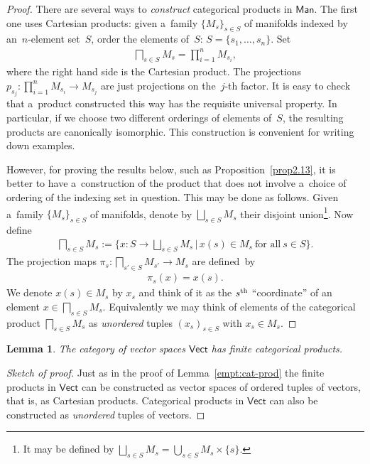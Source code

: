 \documentclass[10pt,a4paper]{amsart}
\numberwithin{equation}{section}
\newtheorem{Lemma}[Theorem]{Lemma}
\begin{document}
\begin{proof}
There are several ways to {\em construct} categorical products in $\mathsf{Man}$.
The f\/irst one uses Cartesian products: given a~family $\{M_s\}_{s\in S}$ of manifolds indexed by an~$n$-element set~$S$,
order the elements of~$S$: $S=\{s_1, \ldots, s_n\}$.
Set
\begin{gather*}
\bigsqcap_{s\in S}M_{s} = \prod\limits_{i=1}^n M_{s_i},
\end{gather*}
where the right hand side is the Cartesian product.
The projections $p_{s_j}: \prod\limits_{i=1}^n M_{s_i} \to M_{s_j} $ are just projections on the~$j$-th factor.
It is easy to check that a~product constructed this way has the requisite universal property.
In particular, if we choose two dif\/ferent orderings of elements of~$S$, the resulting products are canonically
isomorphic.
This construction is convenient for writing down examples.

However, for proving the results below, such as Proposition~\ref{prop2.13}, it is better to have a~construction of the
product that does not involve a~choice of ordering of the indexing set in question.
This may be done as follows.
Given a~family $\{M_s\}_{s\in S} $ of manifolds, denote by $\bigsqcup_{s\in S}M_s$ their disjoint union\footnote{It may
be def\/ined by $\bigsqcup\limits_{s\in S}M_s = \bigcup\limits_{s\in S} M_s\times \{s\}$.}.
Now def\/ine
\begin{gather*}
\bigsqcap_{s\in S}M_{s}:= \bigg\{x\colon S \to \bigsqcup_{s\in S}M_s \, \bigg| \,  x(s)\in M_s\ \text{for all}\ s\in S\bigg\}.
\end{gather*}
The projection maps $\pi_s\colon \bigsqcap\limits_{s'\in S}M_{s'}\to M_s$ are def\/ined~by
\begin{gather*}
\pi_s (x) = x(s).
\end{gather*}
We denote $x(s)\in M_s$ by $x_s$ and think of it as the $s^{\rm th}$ ``coordinate''
of an element $x\in \bigsqcap\limits_{s\in S}M_{s}$.
Equivalently we may think of elements of the categorical product $\bigsqcap_{s\in S}M_{s} $ as {\it unordered} tuples
$(x_s)_{s\in S}$ with $x_s\in M_s$.
\end{proof}

\begin{Lemma}
The category of vector spaces $\mathsf{Vect}$ has finite categorical products.
\label{empt:cat-prod-vect}
\end{Lemma}
\begin{proof}[Sketch of proof] Just as in the proof of Lemma~\ref{empt:cat-prod} the f\/inite products in $\mathsf{Vect}$ can be
constructed as vector spaces of ordered tuples of vectors, that is, as Cartesian products.
Categorical products in $\mathsf{Vect}$ can also be constructed as {\em unordered} tuples of vectors.
\end{proof}
\end{document}
